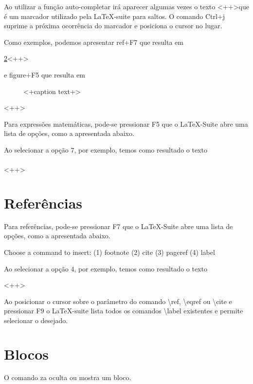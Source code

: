 Ao utilizar a função auto-completar irá aparecer algumas vezes o texto \textless++\textgreater que é um marcador utilizado pela LaTeX-suite para saltos. O comando \textsf{Ctrl}+\textsf{j} suprime a próxima ocorrência do marcador e posiciona o cursor no lugar.

Como exemplos, podemos apresentar \textsf{ref}+\textsf{F7} que resulta em
\begin{code}
    \ref{}<++>
\end{code}
e \textsf{figure}+\textsf{F5} que resulta em
\begin{code}
    \begin{figure}[<+htpb+>]
        \begin{center}
        \end{center}
        \caption{<+caption text+>}
        \label{fig:<+label+>}
    \end{figure}<++>
\end{code}

Para expressões matemáticas, pode-se pressionar \textsf{F5} que o LaTeX-Suite abre uma lista de opções, como a apresentada abaixo.
Ao selecionar a opção $7$, por exemplo, temos como resultado o texto
\begin{code}
    \begin{align}

        \label{<++>}
    \end{align}<++>
\end{code}

\section{Referências}
Para referências, pode-se pressionar \textsf{F7} que o LaTeX-Suite abre uma lista de opções, como a apresentada abaixo.
\begin{code}
    Choose a command to insert:
    (1) footnote    (2) cite
    (3) pageref     (4) label
\end{code}
Ao selecionar a opção $4$, por exemplo, temos como resultado o texto
\begin{code}
    \label{}<++>
\end{code}

Ao posicionar o cursor sobre o parâmetro do comando \textbackslash\textsf{ref}, \textbackslash\textsf{eqref} ou \textbackslash\textsf{cite} e pressionar \textsf{F9} o LaTeX-suite lista todos os comandos \textbackslash\textsf{label} existentes e permite selecionar o desejado.

\section{Blocos}
O comando \textsf{za} oculta ou mostra um bloco.
